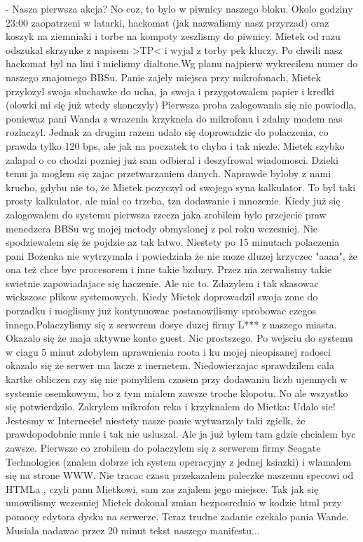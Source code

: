 \documentclass[a4paper,polish,titlepage,12pt]{article}
\begin{document}
- Nasza pierwsza akcja? No coz, to bylo w piwnicy naszego bloku. Okolo godziny 23:00 zaopatrzeni w latarki, hackomat (jak nazwalismy nasz przyrzad) oraz koszyk na ziemniaki i torbe na kompoty zeszlismy do piwnicy. Mietek od razu odszukal skrzynke z napisem >TP< i wyjal z torby pek kluczy. Po chwili nasz hackomat byl na lini i mielismy dialtone.Wg planu najpierw wykrecilem numer do naszego znajomego BBSu. Panie zajely miejsca przy mikrofonach, Mietek przylozyl swoja sluchawke do ucha, ja swoja i przygotowalem papier i kredki (olowki mi się już wtedy skonczyly) Pierwsza proba zalogowania się nie powiodla, poniewaz pani Wanda z wrazenia krzyknela do mikrofonu i zdalny modem nas rozlaczyl. Jednak za drugim razem udalo się doprowadzic do polaczenia, co prawda tylko 120 bps, ale jak na poczatek to chyba i tak niezle. Mietek szybko zalapal o co chodzi pozniej już sam odbieral i deszyfrowal wiadomosci. Dzieki temu ja moglem się zajac przetwarzaniem danych. Naprawde byloby z nami krucho, gdybu nie to, że Mietek pozyczyl od swojego syna kalkulator. To byl taki prosty kalkulator, ale mial co trzeba, tzn dodawanie i mnozenie. Kiedy już się zalogowalem do systemu pierwsza rzecza jaka zrobilem bylo przejecie praw menedzera BBSu wg mojej metody obmyslonej z pol roku wczesniej. Nie spodziewalem się że pojdzie az tak latwo. Niestety po 15 minutach polaczenia pani Bożenka nie wytrzymala i powiedziala że nie moze dluzej krzyczec "aaaa", że ona też chce byc procesorem i inne takie bzdury. Przez nia zerwalismy takie swietnie zapowiadajace się haczenie. Ale nic to. Zdazylem i tak skasowac wiekszosc plikow systemowych. Kiedy Mietek doprowadzil swoja zone do porzadku i moglismy już kontynuowac postanowilismy sprobowac czegos innego.Polaczylismy się z serwerem dosyc duzej firmy L*** z naszego miasta. Okazalo się że maja aktywne konto guest. Nic prostszego. Po wejsciu do systemu w ciagu 5 minut zdobylem uprawnienia roota i ku mojej nieopisanej radosci okazalo się że serwer ma lacze z inernetem. Niedowierzajac sprawdzilem cala kartke obliczen czy się nie pomylilem czasem przy dodawaniu liczb ujemnych w systemie osemkowym, bo z tym mialem zawsze troche klopotu. No ale wszystko się potwierdzilo. Zakrylem mikrofon reka i krzyknalem do Mietka: Udalo sie! Jestesmy w Internecie! niestety nasze panie wytwarzaly taki zgielk, że prawdopodobnie mnie i tak nie usluszal. Ale ja już bylem tam gdzie chcialem byc zawsze. Pierwsze co zrobilem do polaczylem się z serwerem firmy Seagate Technologies (znalem dobrze ich system operacyjny z jednej ksiazki) i wlamalem się na strone WWW. Nie tracac czasu przekazalem paleczke naszemu specowi od HTMLa , czyli panu Mietkowi, sam zas zajalem jego miejsce. Tak jak się umowilismy wczesniej Mietek dokonal zmian bezposrednio w kodzie html przy pomocy edytora dysku na serwerze. Teraz trudne zadanie czekalo pania Wande. Musiala nadawac przez 20 minut tekst naszego manifestu...
\end{document}
